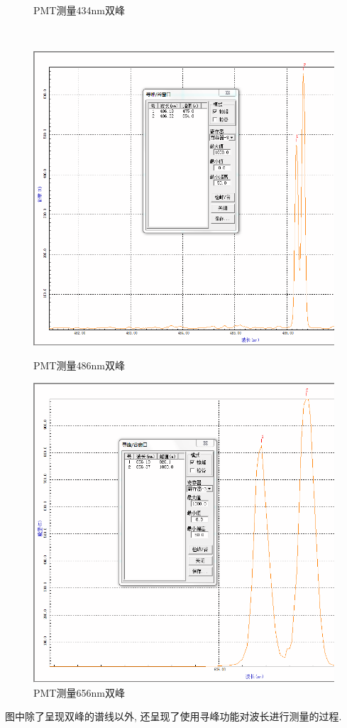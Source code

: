 \documentclass[12pt,a4paper]{article}
\begin{document}
\begin{figure}[htbp]
\begin{minipage}{0.49\linewidth}
		\caption{PMT测量434nm双峰}
		\label{fig4}
	\end{minipage}
	\\
	\begin{minipage}{0.49\linewidth}
		\centering
		\includegraphics[width=0.9\linewidth]{HD_485_487.png}
		\caption{PMT测量486nm双峰}
		\label{fig5}
	\end{minipage}
	\begin{minipage}{0.49\linewidth}
		\centering
		\includegraphics[width=0.9\linewidth]{HD_656_657.png}
		\caption{PMT测量656nm双峰}
		\label{fig6}
	\end{minipage}
\end{figure}
图中除了呈现双峰的谱线以外, 还呈现了使用寻峰功能对波长进行测量的过程. 
\end{document}
